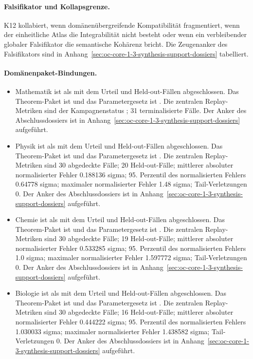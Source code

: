 \paragraph{Falsifikator und Kollapsgrenze.}
K12 kollabiert, wenn domänenübergreifende Kompatibilität fragmentiert, wenn der einheitliche Atlas die Integrabilität nicht besteht oder wenn ein verbleibender globaler Falsifikator die semantische Kohärenz bricht.
Die Zeugenanker des Falsifikators sind in Anhang~\ref{sec:oc-core-1-3-synthesis-support-dossiers} tabelliert.

\paragraph{Domänenpaket-Bindungen.}
\begin{itemize}[leftmargin=1.6em,nosep]
\item Mathematik ist als  mit dem Urteil  und  Held-out-Fällen abgeschlossen. Das Theorem-Paket ist  und das Parametergesetz ist . Die zentralen Replay-Metriken sind der Kampagnenstatus ; 31 terminalisierte Fälle. Der Anker des Abschlussdossiers ist in Anhang~\ref{sec:oc-core-1-3-synthesis-support-dossiers} aufgeführt.
\item Physik ist als  mit dem Urteil  und  Held-out-Fällen abgeschlossen. Das Theorem-Paket ist  und das Parametergesetz ist . Die zentralen Replay-Metriken sind 30 abgedeckte Fälle; 20 Held-out-Fälle; mittlerer absoluter normalisierter Fehler 0.188136 sigma; 95. Perzentil des normalisierten Fehlers 0.64778 sigma; maximaler normalisierter Fehler 1.48 sigma; Tail-Verletzungen 0. Der Anker des Abschlussdossiers ist in Anhang~\ref{sec:oc-core-1-3-synthesis-support-dossiers} aufgeführt.
\item Chemie ist als  mit dem Urteil  und  Held-out-Fällen abgeschlossen. Das Theorem-Paket ist  und das Parametergesetz ist . Die zentralen Replay-Metriken sind 30 abgedeckte Fälle; 19 Held-out-Fälle; mittlerer absoluter normalisierter Fehler 0.533285 sigma; 95. Perzentil des normalisierten Fehlers 1.0 sigma; maximaler normalisierter Fehler 1.597772 sigma; Tail-Verletzungen 0. Der Anker des Abschlussdossiers ist in Anhang~\ref{sec:oc-core-1-3-synthesis-support-dossiers} aufgeführt.
\item Biologie ist als  mit dem Urteil  und  Held-out-Fällen abgeschlossen. Das Theorem-Paket ist  und das Parametergesetz ist . Die zentralen Replay-Metriken sind 30 abgedeckte Fälle; 16 Held-out-Fälle; mittlerer absoluter normalisierter Fehler 0.444222 sigma; 95. Perzentil des normalisierten Fehlers 1.030033 sigma; maximaler normalisierter Fehler 1.438582 sigma; Tail-Verletzungen 0. Der Anker des Abschlussdossiers ist in Anhang~\ref{sec:oc-core-1-3-synthesis-support-dossiers} aufgeführt.

\end{itemize}
